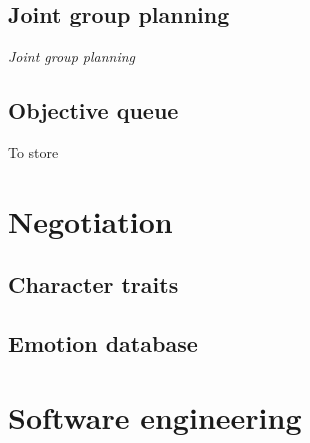 \documentclass[pdftex,12pt,a4paper]{report}
\begin{document}
\subsection{Joint group planning}

\textit{Joint group planning} 



\subsection{Objective queue}

To store



\pagebreak

\section{Negotiation} 

\subsection{Character traits}

\subsection{Emotion database}


\pagebreak

\section{Software engineering}
\end{document}
